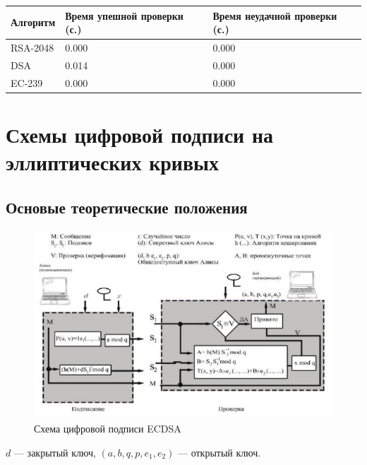 \documentclass[a4paper, 14pt]{extarticle}
\begin{document}
\begin{enumerate}
        \begin{table}[h]
            \centering
            \begin{tabular}{@{}lll@{}}
                \toprule
                \textbf{Алгоритм} & \textbf{Время упешной проверки (с.)} & \textbf{Время неудачной проверки (с.)} \\ \midrule
                RSA-2048          & 0.000                                & 0.000                                  \\
                DSA               & 0.014                                & 0.000                                  \\
                EC-239            & 0.000                                & 0.000                                  \\ \bottomrule
            \end{tabular}
        \end{table}

\end{enumerate}

\section{Схемы цифровой подписи на эллиптических кривых}
\subsection{Основые теоретические положения}
\begin{figure}[h]
    \centering
    \includegraphics[width=\textwidth]{img/S008.jpg}
    \caption{Схема цифровой подписи ECDSA}%
    \label{img:3:1}
\end{figure}
$d$ --- закрытый ключ, $(a, b, q, p, e_1, e_2)$ --- открытый ключ.
\end{document}
